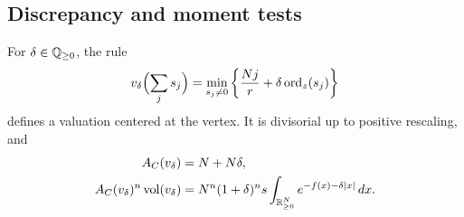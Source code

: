 \subsection{Discrepancy and moment tests}

\begin{lemma}\label{jet:test}
For $\delta\in\mathbb Q_{\ge0}$, the rule
\begin{equation}\label{jet:test-rule}
 v_\delta\Bigl(\sum_j s_j\Bigr)
   =\min_{s_j\ne0}\left\{\frac{Nj}{r}
                           +\delta\operatorname{ord}_z(s_j)\right\}
\end{equation}
defines a valuation centered at the vertex. It is divisorial up to
positive rescaling, and
\begin{align}
 A_C(v_\delta)&=N+N\delta,\label{jet:test-discrepancy}\\
 A_C(v_\delta)^n\operatorname{vol}(v_\delta)
   &=N^n(1+\delta)^n s
        \int_{\mathbb R_{\ge0}^N}e^{-f(x)-\delta|x|}\,dx.
                                      \label{jet:test-volume}
\end{align}
\end{lemma}

